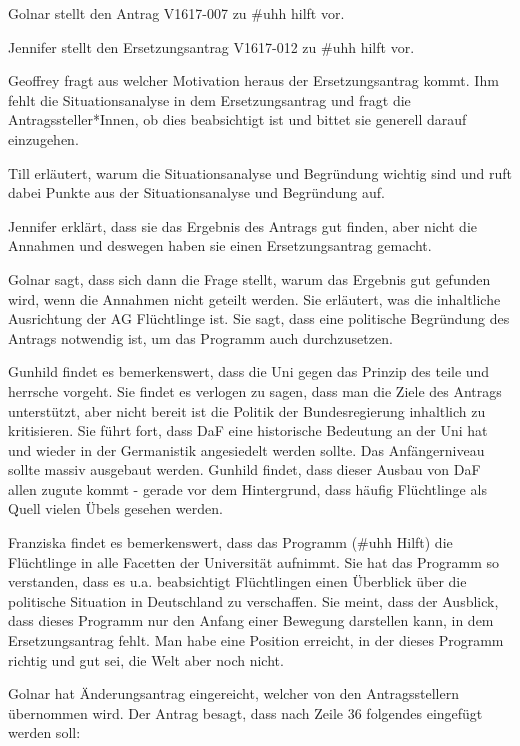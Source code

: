 \documentclass[ngerman,headheight=70pt]{scrartcl}
\begin{document}
    Golnar stellt den Antrag V1617-007 zu \#uhh hilft vor.

    Jennifer stellt den Ersetzungsantrag V1617-012 zu \#uhh hilft vor.

    Geoffrey fragt aus welcher Motivation heraus der Ersetzungsantrag kommt.
    Ihm fehlt die Situationsanalyse in dem Ersetzungsantrag und fragt die
    Antragssteller*Innen, ob dies beabsichtigt ist und bittet sie generell
    darauf einzugehen.

    Till erläutert, warum die Situationsanalyse und Begründung wichtig sind und
    ruft dabei Punkte aus der Situationsanalyse und Begründung auf.

    Jennifer erklärt, dass sie das Ergebnis des Antrags gut finden, aber nicht
    die Annahmen und deswegen haben sie einen Ersetzungsantrag gemacht.

    Golnar sagt, dass sich dann die Frage stellt, warum das Ergebnis gut gefunden
    wird, wenn die Annahmen nicht geteilt werden. Sie erläutert, was die inhaltliche
    Ausrichtung der AG Flüchtlinge ist. Sie sagt, dass eine politische Begründung
    des Antrags notwendig ist, um das Programm auch durchzusetzen.

    Gunhild findet es bemerkenswert, dass die Uni gegen das Prinzip des teile
    und herrsche vorgeht. Sie findet es verlogen zu sagen, dass man die Ziele
    des Antrags unterstützt, aber nicht bereit ist die Politik der Bundesregierung
    inhaltlich zu kritisieren. Sie führt fort, dass DaF eine historische Bedeutung
    an der Uni hat und wieder in der Germanistik angesiedelt werden sollte.
    Das Anfängerniveau sollte massiv ausgebaut werden. Gunhild findet, dass dieser
    Ausbau von DaF allen zugute kommt - gerade vor dem Hintergrund, dass häufig
    Flüchtlinge als Quell vielen Übels gesehen werden.

    Franziska findet es bemerkenswert, dass das Programm (\#uhh Hilft) die Flüchtlinge
    in alle Facetten der Universität aufnimmt. Sie hat das Programm so verstanden,
    dass es u.a. beabsichtigt Flüchtlingen einen Überblick über die politische
    Situation in Deutschland zu verschaffen. Sie meint, dass der Ausblick, dass dieses
    Programm nur den Anfang einer Bewegung darstellen kann, in dem Ersetzungsantrag
    fehlt. Man habe eine Position erreicht, in der dieses Programm richtig und gut
    sei, die Welt aber noch nicht.

    Golnar hat Änderungsantrag eingereicht, welcher von den Antragsstellern
    übernommen wird. Der Antrag besagt, dass nach Zeile 36 folgendes eingefügt
    werden soll:
\end{document}
